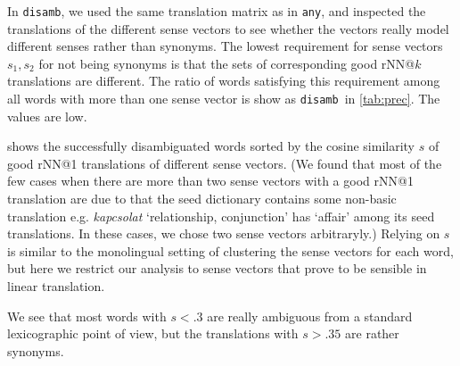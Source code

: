 \documentclass[11pt]{article}
\newcommand{\any}{\texttt{any}}
\newcommand{\disamb}{\texttt{disamb}}
\newcommand{\todo}[1]{}
\begin{document}
In \disamb, we used the same translation matrix as in \any, and inspected the
translations of the different sense vectors to see whether the vectors really
model different senses rather than synonyms.
The lowest requirement for sense vectors $s_1, s_2$ for not being synonyms is
that the sets of corresponding good rNN@$k$ translations are different. The
ratio of words satisfying this requirement among all words with more than one
sense vector is show as \disamb~in \cref{tab:prec}. The values are low.

\newcommand{\bad}{$^\text{\frownie}$}

 shows the successfully disambiguated words sorted by the
cosine similarity $s$ of good rNN@1 translations of different sense vectors. (We
found that most of the few cases when there are more than two sense vectors
with a good rNN@1 translation are due to that the seed dictionary contains some
non-basic translation e.g. \emph{kapcsolat} `relationship, conjunction' has
`affair' among its seed translations. In these cases, we chose two sense
vectors arbitraryly.\todo{When there are sense vectors with more than two
rNN@$k$ hits , the choice of the corresponding target words is also
arbitrary.})  Relying on $s$ is similar to the monolingual setting of
clustering the sense vectors for each word, but here we restrict our analysis
to sense vectors that prove to be sensible in linear translation.

We see that most words with $s<.3$ are really ambiguous from a standard
lexicographic point of view, but the translations with $s>.35$ are rather
synonyms.
\end{document}
